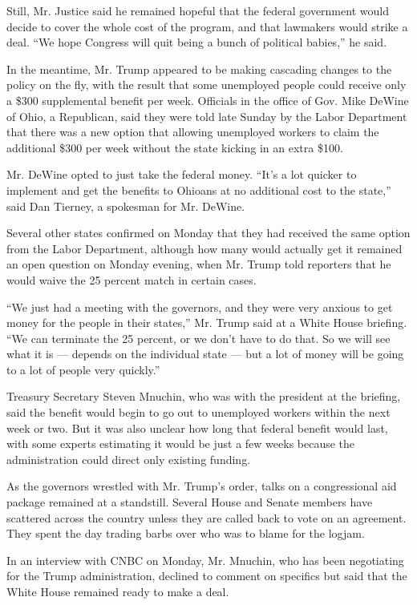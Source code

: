 Still, Mr. Justice said he remained hopeful that the federal government
would decide to cover the whole cost of the program, and that lawmakers
would strike a deal. ``We hope Congress will quit being a bunch of
political babies,'' he said.

In the meantime, Mr. Trump appeared to be making cascading changes to
the policy on the fly, with the result that some unemployed people could
receive only a \$300 supplemental benefit per week. Officials in the
office of Gov. Mike DeWine of Ohio, a Republican, said they were told
late Sunday by the Labor Department that there was a new option that
allowing unemployed workers to claim the additional \$300 per week
without the state kicking in an extra \$100.

Mr. DeWine opted to just take the federal money. ``It's a lot quicker to
implement and get the benefits to Ohioans at no additional cost to the
state,'' said Dan Tierney, a spokesman for Mr. DeWine.

Several other states confirmed on Monday that they had received the same
option from the Labor Department, although how many would actually get
it remained an open question on Monday evening, when Mr. Trump told
reporters that he would waive the 25 percent match in certain cases.

``We just had a meeting with the governors, and they were very anxious
to get money for the people in their states,'' Mr. Trump said at a White
House briefing. ``We can terminate the 25 percent, or we don't have to
do that. So we will see what it is --- depends on the individual state
--- but a lot of money will be going to a lot of people very quickly.''

Treasury Secretary Steven Mnuchin, who was with the president at the
briefing, said the benefit would begin to go out to unemployed workers
within the next week or two. But it was also unclear how long that
federal benefit would last, with some experts estimating it would be
just a few weeks because the administration could direct only existing
funding.

As the governors wrestled with Mr. Trump's order, talks on a
congressional aid package remained at a standstill. Several House and
Senate members have scattered across the country unless they are called
back to vote on an agreement. They spent the day trading barbs over who
was to blame for the logjam.

In an interview with CNBC on Monday, Mr. Mnuchin, who has been
negotiating for the Trump administration, declined to comment on
specifics but said that the White House remained ready to make a deal.

